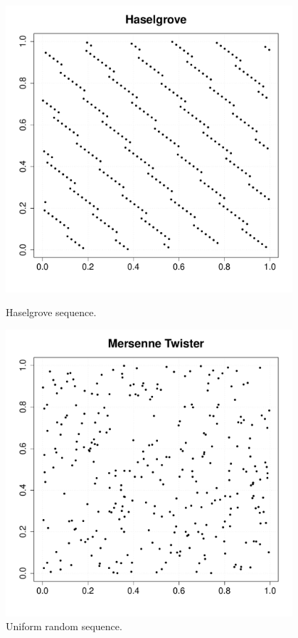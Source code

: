 {        \begin{figure}[H]
          \begin{minipage}{0.5\textwidth}
            \begin{center}
              \includegraphics[width=0.95\textwidth]{Figures/haselgrove_cloud.pdf}
              \caption{Haselgrove sequence.}
              \label{Haselgrove}
            \end{center}
          \end{minipage}
          \hfill
          \begin{minipage}{0.5\textwidth}
            \begin{center}
              \includegraphics[width=0.95\textwidth]{Figures/mersenne_twister_cloud.pdf}
              \caption{Uniform random sequence.}
              \label{UniformRandom}
            \end{center}
          \end{minipage}
        \end{figure}

      }
